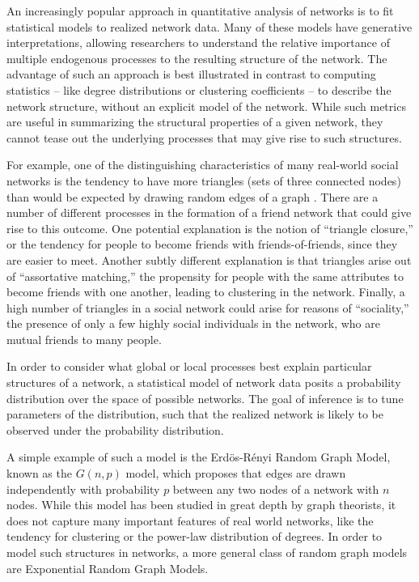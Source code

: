 
An increasingly popular approach in quantitative analysis of networks is to fit statistical models to realized network data. Many of these models have generative interpretations, allowing researchers to understand the relative importance of multiple endogenous processes to the resulting structure of the network. The advantage of such an approach is best illustrated in contrast to computing statistics -- like degree distributions or clustering coefficients -- to describe the network structure, without an explicit model of the network. While such metrics are useful in summarizing the structural properties of a given network, they cannot tease out the underlying processes that may give rise to such structures. 

For example, one of the distinguishing characteristics of many real-world social networks is the tendency to have more triangles (sets of three connected nodes) than would be expected by drawing random edges of a graph \cite{GKM09}. There are a number of different processes in the formation of a friend network that could give rise to this outcome. One potential explanation is the notion of ``triangle closure,'' or the tendency for people to become friends with friends-of-friends, since they are easier to meet. Another subtly different explanation is that triangles arise out of ``assortative matching,'' the propensity for people with the same attributes to become friends with one another, leading to clustering in the network. Finally, a high number of triangles in a social network could arise for reasons of ``sociality,''  the presence of only a few highly social individuals in the network, who are mutual friends to many people.

In order to consider what global or local processes best explain particular structures of a network, a statistical model of network data posits a probability distribution over the space of possible networks. The goal of inference  is to tune parameters of the distribution, such that the realized network is likely to be observed under the probability distribution. 

A simple example of such a model is the Erd\"{o}s-R\'{e}nyi Random Graph Model, known as the $G(n,p)$ model, which proposes that edges are drawn independently with probability $p$ between any two nodes of a network with $n$ nodes. While this model has been studied in great depth by graph theorists, it does not capture many important features of real world networks, like the tendency for clustering or the power-law distribution of degrees. In order to model such structures in networks, a more general class of random graph models are Exponential Random Graph Models.

